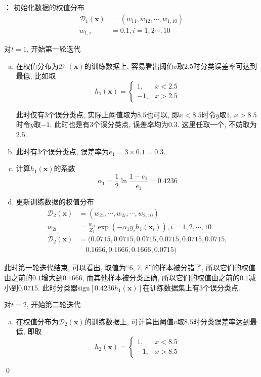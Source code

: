 \documentclass[a4paper,UTF8]{ctexart}
\theoremstyle{plain} \newtheorem{theorem}{定理}[section]
\theoremstyle{plain} \newtheorem{definition}{定义}[section]
\theoremstyle{plain} \newtheorem{lemma}{引理}[section]
\theoremstyle{plain} \newtheorem{proposition}{命题}[section]
\theoremstyle{plain} \newtheorem{example}{例}[section]
\theoremstyle{plain} \newtheorem{remark}{注}[section]
\theoremstyle{plain} \newtheorem{corollary}{推论}[section]
\newenvironment{mysolution}{{\color{blue} 解}： }{{\color{magenta}\qed}}
\begin{document}
\begin{mysolution}
初始化数据的权值分布
\begin{align*}
\mathcal{D}_{1}(\bm{x}) & = (w_{11},w_{12},\cdots, w_{1,10}) \\ 
w_{1,i} & = 0.1, i = 1,2 \cdots, 10
\end{align*}

{\color{red}对$t=1$, 开始第一轮迭代}
\begin{enumerate}[(a)]
\item 在权值分布为$\mathcal{D}_{1}(\bm{x})$的训练数据上, 容易看出阈值$v$取$2.5$时分类误差率可达到最低, 比如取
$$
h_{1}(\bm{x}) = 
\begin{cases}
1, & x < 2.5 \\ 
-1, & x > 2.5
\end{cases}
$$

此时仅有$3$个误分类点, 实际上阈值取为$8.5$也可以, 即$x < 8.5$时令$y$取$1$, $x > 8.5$时令$y$取$-1$, 此时也是有$3$个误分类点, 误差率均为$0.3$. 这里任取一个, 不妨取为$2.5$.

\item 此时有$3$个误分类点, 误差率为$e_{1} = 3 \times 0.1 = 0.3$. 

\item 计算$h_{1}(\bm{x})$的系数
\begin{equation*}
\alpha_{1} = \frac{1}{2} \ln \frac{1 - e_1}{e_1} = 0.4236
\end{equation*}

\item 更新训练数据的权值分布
\begin{align*}
\mathcal{D}_{2}(\bm{x}) & = (w_{21}, \cdots, w_{2i}, \cdots, w_{2,10}) \\ 
w_{2i} & = \frac{w_{1i}}{Z_1} \exp (- \alpha_1 y_i h_{1}(\bm{x}_i)), i = 1,2, \cdots, 10 \\ 
\mathcal{D}_{2}(\bm{x}) & = (0.0715, 0.0715, 0.0715, 0.0715, 0.0715, 0.0715, \\ 
& \quad 0.1666, 0.1666, 0.1666, 0.0715)
\end{align*}

\end{enumerate}

此时第一轮迭代结束, 可以看出, 取值为“6, 7, 8”的样本被分错了, 所以它们的权值由之前的$0.1$增大到$0.1666$, 而其他样本被分类正确, 所以它们的权值由之前的$0.1$减小到$0.0715$. 此时分类器$\mathrm{sign}[0.4236 h_{1}(\bm{x})]$在训练数据集上有$3$个误分类点.

{\color{red}对$t = 2$, 开始第二轮迭代}
\begin{enumerate}[(a)]
\item 在权值分布为$\mathcal{D}_{2}(\bm{x})$的训练数据上, 可计算出阈值$v$取$8.5$时分类误差率达到最低, 即取
$$
h_{2}(\bm{x}) = 
\begin{cases}
1, & x < 8.5 \\ 
-1, & x > 8.5
\end{cases}
$$


\end{enumerate}
\end{mysolution}
\end{document}
